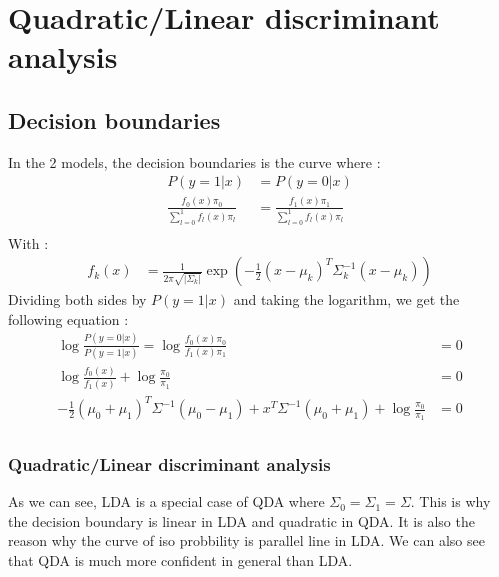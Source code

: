 \documentclass[12pt]{article}
\begin{document}
\section{Quadratic/Linear discriminant analysis}
\subsection{Decision boundaries}
In the 2 models, the decision boundaries is the curve where :
\begin{align}	
P(y=1|x) &= P(y=0|x)\\
\frac{f_0(x)\pi_0}{\sum^1_{l=0}f_l(x)\pi_l}&=\frac{f_1(x)\pi_1}{\sum^1_{l=0}f_l(x)\pi_l}\\
\end{align}
With : 
\begin{align}
	f_k(x) &= \frac{1}{2\pi\sqrt{|\Sigma_k|}}\exp\left(-\frac{1}{2}(x-\mu_k)^T\Sigma_k^{-1}(x-\mu_k)\right)
\end{align}
Dividing both sides by $P(y=1|x)$ and taking the logarithm, we get the following equation :
\begin{align}
	\log\frac{P(y=0|x)}{P(y=1|x)} = \log\frac{f_0(x)\pi_0}{f_1(x)\pi_1 }&=0\\
	\log\frac{f_0(x)}{f_1(x)} + \log\frac{\pi_0}{\pi_1}&= 0\\
	-\frac{1}{2}(\mu_0+\mu_1)^T\Sigma^{-1}(\mu_0-\mu_1) + x^T\Sigma^{-1}(\mu_0+\mu_1)+  \log\frac{\pi_0}{\pi_1} &= 0
\end{align}
\subsection{}
\subsubsection[]{Quadratic/Linear discriminant analysis}
As we can see, LDA is a special case of QDA where $\Sigma_0=\Sigma_1=\Sigma$. This is why the decision boundary is linear in LDA and quadratic in QDA.
It is also the reason why the curve of iso probbility is parallel line in LDA. We can also see that QDA is much more confident in general than LDA.
\end{document}
